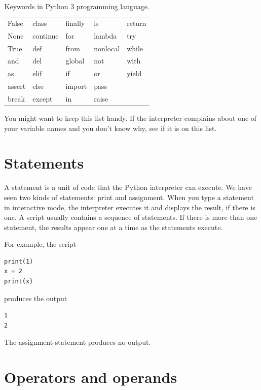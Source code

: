 \begin{table}[htb]
\begin{center}
\begin{tabular}{lllll}
False & class & finally & is & return\\
None & continue & for & lambda & try\\
True & def & from & nonlocal & while\\
and & del & global & not & with\\
as & elif & if & or & yield\\
assert & else & import & pass & \\
break & except & in & raise & \\
\end{tabular}
\caption{Keywords in Python 3 programming language.}
\label{tab:python_keywords} 
\end{center}
\end{table}
%
You might want to keep this list handy.  If the interpreter complains
about one of your variable names and you don't know why, see if it
is on this list.


\section{Statements}

A statement is a unit of code that the Python interpreter can
execute.  We have seen two kinds of statements: print
and assignment.
%
%
When you type a statement in interactive mode, the interpreter
executes it and displays the result, if there is one.
%
A script usually contains a sequence of statements.  If there
is more than one statement, the results appear one at a time
as the statements execute.

For example, the script

\beforeverb
\begin{verbatim}
print(1)
x = 2
print(x)
\end{verbatim}
\afterverb
%
produces the output

\beforeverb
\begin{verbatim}
1
2
\end{verbatim}
\afterverb
%
The assignment statement produces no output.


\section{Operators and operands}

